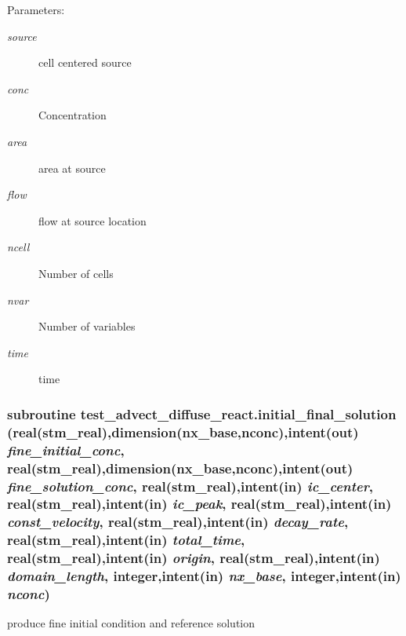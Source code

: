 \begin{Desc}
\item[Parameters:]
\begin{description}
\item[{\em source}]cell centered source \item[{\em conc}]Concentration\item[{\em area}]area at source \item[{\em flow}]flow at source location\item[{\em ncell}]Number of cells\item[{\em nvar}]Number of variables\item[{\em time}]time \end{description}
\end{Desc}
\hypertarget{a00074_5ee264a75b8c23710adbd0ab12473a15}{
\subsubsection[{initial\_\-final\_\-solution}]{\setlength{\rightskip}{0pt plus 5cm}subroutine test\_\-advect\_\-diffuse\_\-react.initial\_\-final\_\-solution (real(stm\_\-real),dimension(nx\_\-base,nconc),intent(out) {\em fine\_\-initial\_\-conc}, \/  real(stm\_\-real),dimension(nx\_\-base,nconc),intent(out) {\em fine\_\-solution\_\-conc}, \/  real(stm\_\-real),intent(in) {\em ic\_\-center}, \/  real(stm\_\-real),intent(in) {\em ic\_\-peak}, \/  real(stm\_\-real),intent(in) {\em const\_\-velocity}, \/  real(stm\_\-real),intent(in) {\em decay\_\-rate}, \/  real(stm\_\-real),intent(in) {\em total\_\-time}, \/  real(stm\_\-real),intent(in) {\em origin}, \/  real(stm\_\-real),intent(in) {\em domain\_\-length}, \/  integer,intent(in) {\em nx\_\-base}, \/  integer,intent(in) {\em nconc})}}
\label{a00074_5ee264a75b8c23710adbd0ab12473a15}


produce fine initial condition and reference solution 

